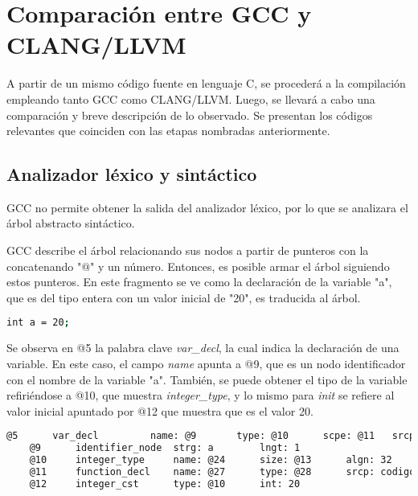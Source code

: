 \chapter{Comparación entre GCC y CLANG/LLVM}

A partir de un mismo código fuente en lenguaje C, 
se procederá a la compilación empleando tanto GCC como CLANG/LLVM. 
Luego, se llevará a cabo una comparación y breve descripción de lo
observado. Se presentan los códigos relevantes que coinciden 
con las etapas nombradas anteriormente.

\section{Analizador léxico y sintáctico}
GCC no permite obtener la salida del analizador léxico, por lo que se analizara 
el árbol abstracto sintáctico. 

GCC describe el árbol relacionando sus nodos a partir de punteros con la concatenando 
"@" y un número. Entonces, es posible armar el árbol siguiendo estos punteros. 
En este fragmento se ve como la declaración de la variable "a", que es del tipo entera con 
un valor inicial de "20", es traducida al árbol.

\begin{lstlisting}[label=comandoC, caption= Fragmento del código fuente del archivo codigo-ejemplo.c. \cite{repositorio}, language=bash]
    int a = 20;      \end{lstlisting}

Se observa en @5 la palabra clave \emph{var\_decl}, la cual indica la declaración de una variable. En este 
caso, el campo \emph{name} apunta a @9, que es un nodo identificador con el nombre de la variable "a". 
También, se puede obtener el tipo de la variable refiriéndose a @10, que muestra \emph{integer\_type}, y lo 
mismo para \emph{init} se refiere al valor inicial apuntado por @12 que muestra que es el valor 20.

\begin{lstlisting}[label=comandoC, caption= Fragmento del árbol de GCC del archivo codigo-ejemplo.c.005t.original. \cite{repositorio}, language=bash]
    @5      var_decl         name: @9       type: @10      scpe: @11   srcp: codigo-ejemplo.c:5      init: @12     
    @9      identifier_node  strg: a        lngt: 1       
    @10     integer_type     name: @24      size: @13      algn: 32      prec: 32       sign: signed   min : @25     max : @26     
    @11     function_decl    name: @27      type: @28      srcp: codigo-ejemplo.c:3      
    @12     integer_cst      type: @10      int: 20    \end{lstlisting}

